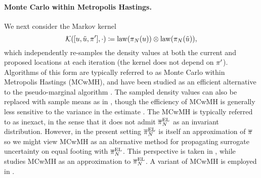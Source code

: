 \documentclass[12pt]{article}
\begin{document}
\paragraph{Monte Carlo within Metropolis Hastings.}
We next consider the Markov kernel 
\begin{equation}
\postSampleKernel([\Par, \propPar, \postDens^\prime], \cdot)
\Def \mathrm{law}(\postEm[\Ndesign](\Par)) \otimes \mathrm{law}(\postEm[\Ndesign](\propPar)),
\end{equation}
which independently re-samples the density values at both the current and proposed locations
at each iteration (the kernel does not depend on $\postDens^\prime$). Algorithms of this form are 
typically referred to as Monte Carlo within Metropolis Hastings (MCwMH), and have been studied as an
efficient alternative to the pseudo-marginal algorithm \citep{noisyMCMC,stabilityNoisyMH}.
The sampled density values can also be replaced with sample means as in ,
though the efficiency of MCwMH is generally less sensitive to the variance in the estimate
\citep{garegnani2021NoisyMCMC,stabilityNoisyMH}.
The MCwMH is typically referred to as inexact, in the sense that it does not admit 
$\postApproxNormMarg[\Ndesign]$ as an invariant distribution. However, in the present setting
$\postApproxNormMarg[\Ndesign]$ is itself an approximation of $\postDensNorm$ so we might
view MCwMH as an alternative method for propagating surrogate uncertainty
on equal footing with $\postApproxNormMarg[\Ndesign]$. This perspective is taken in 
\citet{surrogateNoisyMCMC}, while \citet{garegnani2021NoisyMCMC} studies MCwMH
as an approximation to $\postApproxNormMarg[\Ndesign]$. A variant of MCwMH
is employed in \citet{FerEmulation}.
\end{document}
